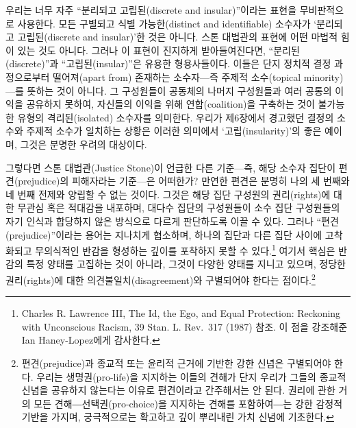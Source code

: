 \documentclass[a4paper,12pt,oneside]{article}  %
\begin{document}
우리는 너무 자주 ``분리되고 고립된(discrete and insular)''이라는 표현을
무비판적으로 사용한다. 모든 구별되고 식별 가능한(distinct and
identifiable) 소수자가 `분리되고 고립된(discrete and insular)'한 것은
아니다. 스톤 대법관의 표현에 어떤 마법적 힘이 있는 것도 아니다. 그러나
이 표현이 진지하게 받아들여진다면, ``분리된(discrete)''과
``고립된(insular)''은 유용한 형용사들이다. 이들은 단지 정치적 결정
과정으로부터 떨어져(apart from) 존재하는 소수자---즉 주제적 소수(topical
minority)---를 뜻하는 것이 아니다. 그 구성원들이 공동체의 나머지
구성원들과 여러 공통의 이익을 공유하지 못하여, 자신들의 이익을 위해
연합(coalition)을 구축하는 것이 불가능한 유형의 격리된(isolated)
소수자를 의미한다. 우리가 제6장에서 경고했던 결정의 소수와 주제적 소수가
일치하는 상황은 이러한 의미에서 `고립(insularity)'의 좋은 예이며, 그것은
분명한 우려의 대상이다.

그렇다면 스톤 대법관(Justice Stone)이 언급한 다른 기준---즉, 해당 소수자
집단이 편견(prejudice)의 피해자라는 기준---은 어떠한가? 만연한 편견은
분명히 나의 세 번째와 네 번째 전제와 양립할 수 없는 것이다. 그것은 해당
집단 구성원의 권리(rights)에 대한 무관심 혹은 적대감을 내포하며, 대다수
집단의 구성원들이 소수 집단 구성원들의 자기 인식과 합당하지 않은
방식으로 다르게 판단하도록 이끌 수 있다. 그러나
``편견(prejudice)''이라는 용어는 지나치게 협소하며, 하나의 집단과 다른
집단 사이에 고착화되고 무의식적인 반감을 형성하는 깊이를 포착하지 못할
수 있다.\footnote{Charles R. Lawrence III, The Id, the Ego, and Equal
  Protection: Reckoning with Unconscious Racism, 39 Stan. L. Rev.~317
  (1987) 참조. 이 점을 강조해준 Ian Haney-Lopez에게 감사한다.} 여기서
핵심은 반감의 특정 양태를 고집하는 것이 아니라, 그것이 다양한 양태를
지니고 있으며, 정당한 권리(rights)에 대한 의견불일치(disagreement)와
구별되어야 한다는 점이다.\footnote{편견(prejudice)과 종교적 또는 윤리적
  근거에 기반한 강한 신념은 구별되어야 한다. 우리는 생명권(pro-life)을
  지지하는 이들의 견해가 단지 우리가 그들의 종교적 신념을 공유하지
  않는다는 이유로 편견이라고 간주해서는 안 된다. 권리에 관한 거의 모든
  견해―선택권(pro-choice)을 지지하는 견해를 포함하여―는 강한 감정적
  기반을 가지며, 궁극적으로는 확고하고 깊이 뿌리내린 가치 신념에
  기초한다.}
\end{document}
